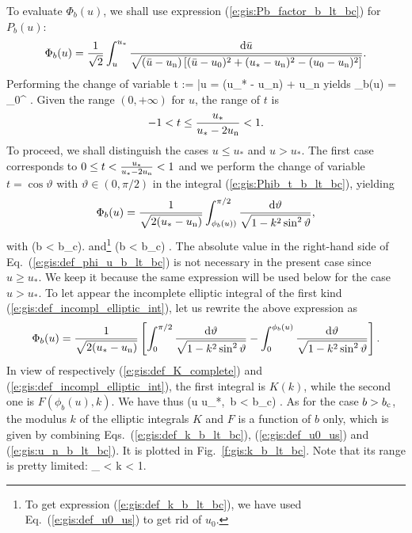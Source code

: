 To evaluate $\Phi_b(u)$, we shall use expression (\ref{e:gis:Pb_factor_b_lt_bc})
for $P_b(u)$:
\[
    \Phi_b(u) = \frac{1}{\sqrt{2}} \int_u^{u_*}
    \frac{\mathrm{d}\bar{u}}{\sqrt{ (\bar{u} - u_{\rm n}) \left[
        (\bar{u} - u_0)^2 + (u_* - u_{\rm n})^2 - (u_0 - u_{\rm n})^2  \right]}} .
\]
Performing the change of variable
\be
    t := 
    \quad\iff\quad
    \bar{u} = (u_* - u_{\rm n})  + u_{\rm n}
\ee
yields
\be \label{e:gis:Phib_t_b_lt_bc}
    \Phi_b(u) =  \int_0^{}
     .
\ee
Given the range $(0, +\infty)$ for $u$, the range of $t$ is
\[
    -1 < t \leq \frac{u_*}{u_* - 2 u_{\rm n}} < 1 .
\]
To proceed, we shall distinguish the cases $u \leq u_*$ and $u> u_*$.
The first case corresponds to $0 \leq t < \frac{u_*}{u_* - 2 u_{\rm n}} < 1$ and we
perform the change of variable $t = \cos\vartheta$ with $\vartheta\in(0, \pi/2)$ in the integral
(\ref{e:gis:Phib_t_b_lt_bc}), yielding
\[
    \Phi_b(u) =  \frac{1}{\sqrt{2(u_* - u_{\rm n})}} \int_{\phi_b(u))}^{\pi/2}
        \frac{\mathrm{d}\vartheta}{\sqrt{1 - k^2 \sin^2\vartheta}} ,
\]
with
\be \label{e:gis:def_phi_u_b_lt_bc}
   \qquad (b < b_{\rm c}).
\ee
and\footnote{To get expression (\ref{e:gis:def_k_b_lt_bc}), we have used
Eq.~(\ref{e:gis:def_u0_us}) to get rid of $u_0$.}
\be \label{e:gis:def_k_b_lt_bc}
    \qquad
    (b < b_{\rm c}) .
\ee
The absolute value in the right-hand side of Eq.~(\ref{e:gis:def_phi_u_b_lt_bc}) is not necessary
in the present case since $u \geq u_*$. We keep it because the same
expression will be used below for the case $u > u_*$.
To let appear the incomplete elliptic integral of the first
kind (\ref{e:gis:def_incompl_elliptic_int}), let us rewrite the above
expression as
\[
   \Phi_b(u) =  \frac{1}{\sqrt{2(u_* - u_{\rm n})}}
   \left[ \int_{0}^{\pi/2}
        \frac{\mathrm{d}\vartheta}{\sqrt{1 - k^2 \sin^2\vartheta}}
        - \int_{0}^{\phi_b(u)}
        \frac{\mathrm{d}\vartheta}{\sqrt{1 - k^2 \sin^2\vartheta}} \right] .
\]
In view of respectively (\ref{e:gis:def_K_complete}) and (\ref{e:gis:def_incompl_elliptic_int}),
the first integral is $K(k)$, while the second one is
$F(\phi_b(u), k)$.
We have thus
\be \label{e:gis:Phib_u_lt_us}
    \qquad (u \leq u_*,\ b < b_{\rm c}) .
\ee
As for the case $b>b_{\rm c}$, the modulus $k$ of the elliptic integrals $K$
and $F$ is a function of $b$ only, which
is given by combining Eqs.~(\ref{e:gis:def_k_b_lt_bc}), (\ref{e:gis:def_u0_us})
and (\ref{e:gis:u_n_b_lt_bc}). It is plotted in Fig.~\ref{f:gis:k_b_lt_bc}.
Note that its range is pretty limited:
\be
    _{}
    < k < 1.
\ee

